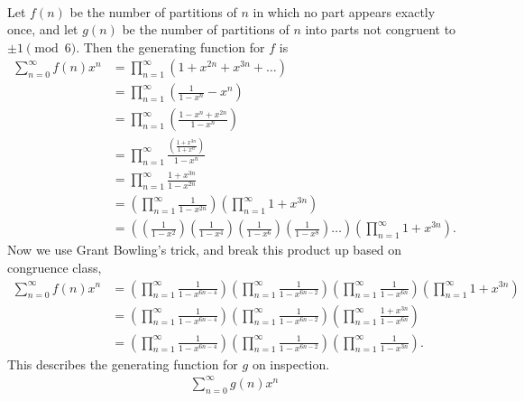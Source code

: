 \documentclass{article}
\newenvironment{solution}[1][Solution.]{\begin{trivlist}
\item[\hskip \labelsep {\bfseries #1}]}{\end{trivlist}}
\begin{document}
\begin{solution} \text{} \\
  Let $f(n)$ be the number of partitions of $n$ in which no part appears exactly
  once, and let $g(n)$ be the number of partitions of $n$ into parts not
  congruent to $\pm 1 \pmod6$.
  Then the generating function for $f$ is
  \begin{align*}
    \sum_{n=0}^\infty f(n) x^n
    &= \prod_{n=1}^\infty (1 + x^{2n} + x^{3n} + \hdots) \\
    &= \prod_{n=1}^\infty \left(\frac{1}{1-x^n} - x^n\right) \\
    &= \prod_{n=1}^\infty \left(\frac{1 - x^n + x^{2n}}{1-x^n}\right) \\
    &= \prod_{n=1}^\infty \frac{
      \displaystyle\left(\frac{1 + x^{3n}}{1 + x^{n}}\right)
    }{1-x^n} \\
    &= \prod_{n=1}^\infty \frac{1 + x^{3n}}{1-x^{2n}} \\
    &= \left(\prod_{n=1}^\infty \frac{1}{1-x^{2n}}\right)
    \left(\prod_{n=1}^\infty 1 + x^{3n} \right) \\
    &= \left(
      \left(\frac{1}{1-x^{2}}\right)
      \left(\frac{1}{1-x^{4}}\right)
      \left(\frac{1}{1-x^{6}}\right)
      \left(\frac{1}{1-x^{8}}\right)
      \hdots
    \right)
    \left(\prod_{n=1}^\infty 1 + x^{3n} \right).
  \end{align*}
    Now we use Grant Bowling's trick, and break this product up based on
    congruence class,
  \begin{align*}
    \sum_{n=0}^\infty f(n) x^n
    &= \left(\prod_{n=1}^\infty\frac{1}{1-x^{6n - 4}}\right)
    \left(\prod_{n=1}^\infty\frac{1}{1-x^{6n - 2}}\right)
    \left(\prod_{n=1}^\infty\frac{1}{1-x^{6n}}\right)
    \left(\prod_{n=1}^\infty 1 + x^{3n} \right) \\
    &= \left(\prod_{n=1}^\infty\frac{1}{1-x^{6n - 4}}\right)
    \left(\prod_{n=1}^\infty\frac{1}{1-x^{6n - 2}}\right)
    \left(\prod_{n=1}^\infty\frac{1 + x^{3n}}{1-x^{6n}}\right)\\
    &= \left(\prod_{n=1}^\infty\frac{1}{1-x^{6n - 4}}\right)
    \left(\prod_{n=1}^\infty\frac{1}{1-x^{6n - 2}}\right)
    \left(\prod_{n=1}^\infty\frac{1}{1-x^{3n}}\right).
  \end{align*}
  This describes the generating function for $g$ on inspection. \begin{align*}
    \sum_{n=0}^\infty g(n) x^n

\end{align*}
\end{solution}
\end{document}
